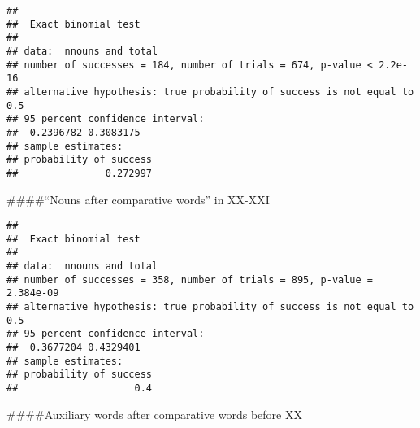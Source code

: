 \documentclass[
]{article}
\newenvironment{Shaded}{\begin{snugshade}}{\end{snugshade}}
\newcommand{\DecValTok}[1]{\textcolor[rgb]{0.00,0.00,0.81}{#1}}
\newcommand{\KeywordTok}[1]{\textcolor[rgb]{0.13,0.29,0.53}{\textbf{#1}}}
\newcommand{\NormalTok}[1]{#1}
\newcommand{\OperatorTok}[1]{\textcolor[rgb]{0.81,0.36,0.00}{\textbf{#1}}}
\newcommand{\StringTok}[1]{\textcolor[rgb]{0.31,0.60,0.02}{#1}}
\begin{document}
\begin{verbatim}
## 
##  Exact binomial test
## 
## data:  nnouns and total
## number of successes = 184, number of trials = 674, p-value < 2.2e-16
## alternative hypothesis: true probability of success is not equal to 0.5
## 95 percent confidence interval:
##  0.2396782 0.3083175
## sample estimates:
## probability of success 
##               0.272997
\end{verbatim}

\#\#\#\#``Nouns after comparative words'' in XX-XXI

\begin{Shaded}
\end{Shaded}

\begin{verbatim}
## 
##  Exact binomial test
## 
## data:  nnouns and total
## number of successes = 358, number of trials = 895, p-value = 2.384e-09
## alternative hypothesis: true probability of success is not equal to 0.5
## 95 percent confidence interval:
##  0.3677204 0.4329401
## sample estimates:
## probability of success 
##                    0.4
\end{verbatim}

\#\#\#\#Auxiliary words after comparative words before XX

\begin{Shaded}
\end{Shaded}
\end{document}
